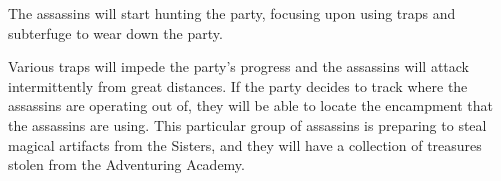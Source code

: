 The assassins will start hunting the party, focusing upon using traps and subterfuge to wear down the party.

Various traps will impede the party's progress and the assassins will attack intermittently from great distances.
If the party decides to track where the assassins are operating out of, they will be able to locate the encampment that the assassins are using.
This particular group of assassins is preparing to steal magical artifacts from the Sisters, and they will have a collection of treasures stolen from the Adventuring Academy.